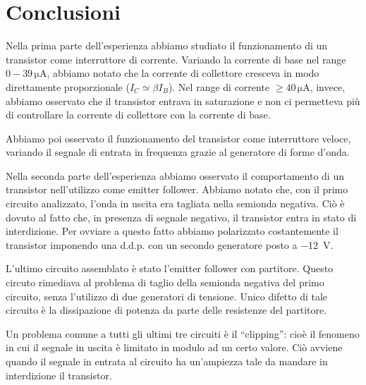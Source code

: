 \section{Conclusioni}

Nella prima parte dell'esperienza abbiamo studiato il funzionamento di un transistor come interruttore di corrente.
Variando la corrente di base nel range $0 - 39\,\si{\micro\ampere}$, abbiamo notato che la corrente di collettore cresceva in modo direttamente proporzionale ($I_C \simeq \beta I_B$).
Nel range di corrente $\geq 40 \,\si{\micro\ampere}$, invece, abbiamo osservato che il transistor entrava in saturazione e non ci permetteva più di controllare la corrente di collettore con la corrente di base.

Abbiamo poi osservato il funzionamento del transistor come interruttore veloce, variando il segnale di entrata in frequenza grazie al generatore di forme d'onda.

Nella seconda parte dell'esperienza abbiamo osservato il comportamento di un transistor nell'utilizzo come emitter follower.
Abbiamo notato che, con il primo circuito analizzato, l'onda in uscita era tagliata nella semionda negativa.
Ciò è dovuto al fatto che, in presenza di segnale negativo, il transistor entra in stato di interdizione.
Per ovviare a questo fatto abbiamo polarizzato costantemente il transistor imponendo una d.d.p. con un secondo generatore posto a \SI{-12}{\volt}.

L'ultimo circuito assemblato è stato l'emitter follower con partitore.
Questo circuto rimediava al problema di taglio della semionda negativa del primo circuito, senza l'utilizzo di due generatori di tensione. Unico difetto di tale circuito è la dissipazione di potenza da parte delle resistenze del partitore.

Un problema comune a tutti gli ultimi tre circuiti è il ``clipping'': cioè il fenomeno in cui il segnale in uscita è limitato in modulo ad un certo valore.
Ciò avviene quando il segnale in entrata al circuito ha un'ampiezza tale da mandare in interdizione il transistor.
